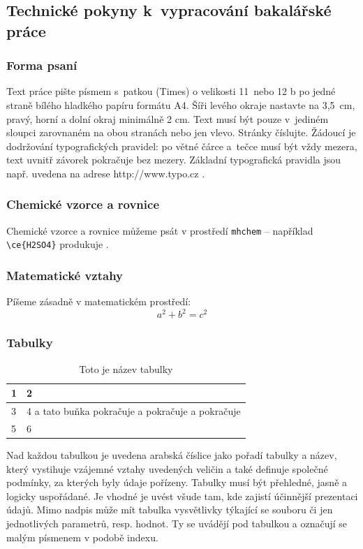 \documentclass[a4paper, 12pt]{article}
\begin{document}
\subsection{Technické pokyny k~vypracování bakalářské práce}
\subsubsection*{Forma psaní}
Text práce pište písmem s~patkou (Times) o velikosti 11~nebo 12 b po jedné straně bílého hladkého papíru formátu A4. Šíři levého okraje nastavte na 3,5~cm, pravý, horní a dolní okraj minimálně 2 cm. Text musí být pouze v~jediném sloupci zarovnaném na obou stranách nebo jen vlevo. Stránky číslujte. Žádoucí je dodržování typografických pravidel: po větné čárce a~tečce musí být vždy mezera, text uvnitř závorek pokračuje bez mezery. Základní typografická pravidla jsou např. uvedena na adrese http://www.typo.cz .

\subsubsection*{Chemické vzorce a rovnice}
Chemické vzorce a rovnice můžeme psát v prostředí \texttt{mhchem} -- například \texttt{\textbackslash{}ce\{H2SO4\}} produkuje .

\subsubsection*{Matematické vztahy}
Píšeme zásadně v matematickém prostředí:
$$ a^2 + b^2 = c^2 $$

\subsubsection*{Tabulky}
\begin{table}[h]
\caption{Toto je název tabulky}
\begin{center}
\begin{tabular}{|l|l|}
\hline
1 & 2\\
\hline
3 & 4 a tato buňka pokračuje a pokračuje a pokračuje \\
5 & 6 \\
\hline
\end{tabular}
\end{center}
\end{table}

Nad každou tabulkou je uvedena arabská číslice jako pořadí tabulky a název, který vystihuje vzájemné vztahy uvedených veličin a také definuje společné podmínky, za kterých byly údaje pořízeny. Tabulky musí být přehledné, jasně a logicky uspořádané. Je vhodné je uvést všude tam, kde zajistí účinnější prezentaci údajů. Mimo nadpis může mít tabulka vysvětlivky týkající se souboru či jen jednotlivých parametrů, resp. hodnot. Ty se uvádějí pod tabulkou a označují se malým písmenem v podobě indexu.
\end{document}
